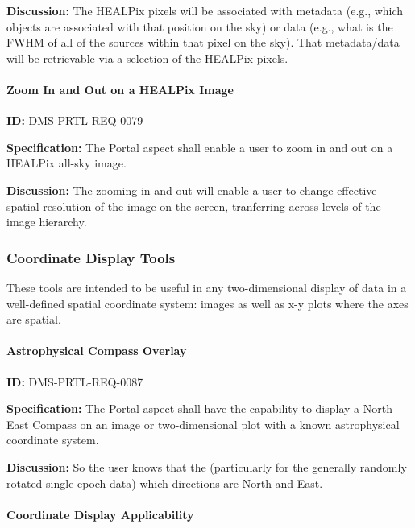 \documentclass[SE,toc,lsstdraft]{lsstdoc}
\begin{document}
\textbf{Discussion:}
The HEALPix pixels will be associated with metadata (e.g., which objects are associated with that position on the sky) or data (e.g., what is the FWHM of all of the sources within that pixel on the sky).  That metadata/data will be retrievable via a selection of the HEALPix pixels.

\paragraph{Zoom In and Out on a HEALPix Image}\hfill  %

\label{DMS-PRTL-REQ-0079}
\textbf{ID:} DMS-PRTL-REQ-0079

\textbf{Specification:}
The Portal aspect shall enable a user to zoom in and out on a HEALPix all-sky image.

\textbf{Discussion:}
The zooming in and out will enable a user to change effective spatial resolution of the image on the screen, tranferring across levels of the image hierarchy.

\subsubsection{Coordinate Display Tools}

These tools are intended to be useful in any two-dimensional display of data in a well-defined spatial coordinate system: images as well as x-y plots where the axes are spatial.

\paragraph{Astrophysical Compass Overlay}\hfill  %

\label{DMS-PRTL-REQ-0087}
\textbf{ID:} DMS-PRTL-REQ-0087

\textbf{Specification:}
The Portal aspect shall have the capability to display a North-East Compass on an image or two-dimensional plot with a known astrophysical coordinate system.

\textbf{Discussion:}
So the user knows that the (particularly for the generally randomly rotated single-epoch data) which directions are North and East.

\paragraph{Coordinate Display Applicability}\hfill  %
\end{document}
